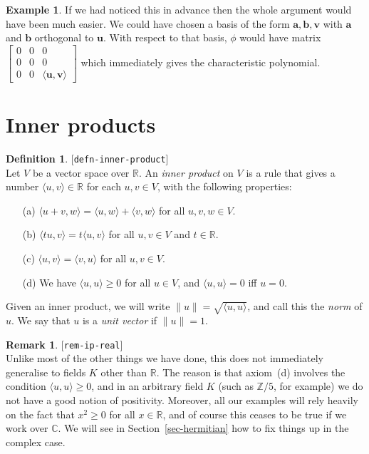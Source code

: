 \documentclass{amsart}
\newcommand{\lbl}[1]{\label{#1}\textup{[\texttt{#1}]}\ \\}
\newcommand{\lbl}{\label}
\newcommand{\R}         {{\mathbb{R}}}
\newcommand{\C}         {{\mathbb{C}}}
\newcommand{\Z}         {{\mathbb{Z}}}
\newcommand{\bsm}       {\left[\begin{smallmatrix}}
\newcommand{\esm}       {\end{smallmatrix}\right]}
\newcommand{\ip}[1]     {\langle #1\rangle}
\newcommand{\va}        {\mathbf{a}}
\newcommand{\vb}        {\mathbf{b}}
\newcommand{\vu}        {\mathbf{u}}
\newcommand{\vv}        {\mathbf{v}}
\renewcommand{\:}       {\colon}
\theoremstyle{definition}
\newtheorem{remark}[theorem]{Remark}
\newtheorem{definition}[theorem]{Definition}
\newtheorem{example}[theorem]{Example}
\begin{document}
\begin{example}
 If we had noticed this in advance then the whole argument
 would have been much easier.  We could have chosen a basis
 of the form $\va,\vb,\vv$ with $\va$ and $\vb$ orthogonal
 to $\vu$.  With respect to that basis, $\phi$ would have
 matrix $\bsm 0&0&0\\0&0&0\\0&0&\ip{\vu,\vv}\esm$ which
 immediately gives the characteristic polynomial.
\end{example}

\section{Inner products}
\label{sec-inner}

\begin{definition}\lbl{defn-inner-product}
 Let $V$ be a vector space over $\R$.  An \emph{inner
  product} on $V$ is a rule that gives a number
 $\ip{u,v}\in\R$ for each $u,v\in V$, with the following
 properties: 
 \begin{itemize}
  \item[(a)] $\ip{u+v,w}=\ip{u,w}+\ip{v,w}$ for all
   $u,v,w\in V$.
  \item[(b)] $\ip{tu,v}=t\ip{u,v}$ for all $u,v\in V$ and
   $t\in\R$.
  \item[(c)] $\ip{u,v}=\ip{v,u}$ for all $u,v\in V$.
  \item[(d)] We have $\ip{u,u}\geq 0$ for all $u\in V$, and
   $\ip{u,u}=0$ iff $u=0$.
 \end{itemize}
 Given an inner product, we will write
 $\|u\|=\sqrt{\ip{u,u}}$, and call this the \emph{norm} of
 $u$.  We say that $u$ is a \emph{unit vector} if
 $\|u\|=1$. 
\end{definition}
\begin{remark}\lbl{rem-ip-real}
 Unlike most of the other things we have done, this does not
 immediately generalise to fields $K$ other than $\R$.  The
 reason is that axiom~(d) involves the condition
 $\ip{u,u}\geq 0$, and in an arbitrary field $K$ (such as
 $\Z/5$, for example) we do not have a good notion of
 positivity.  Moreover, all our examples will rely heavily
 on the fact that $x^2\geq 0$ for all $x\in\R$, and of
 course this ceases to be true if we work over $\C$.  We
 will see in Section~\ref{sec-hermitian} how to fix things
 up in the complex case.
\end{remark}
\end{document}
